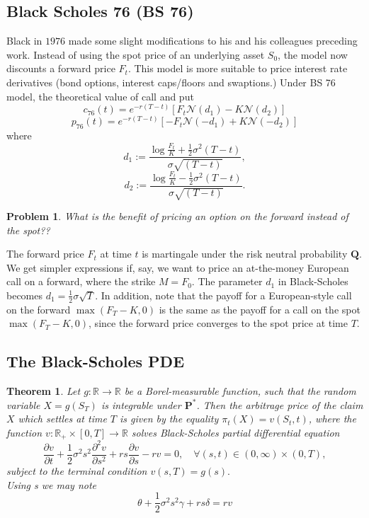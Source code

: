 \documentclass{book}
\newtheorem{theorem}{Theorem}[section]
\newtheorem{problem}{Problem}[section]
\begin{document}
\subsection{Black Scholes 76 (BS 76)}
Black in $1976$ made some slight modifications to his and his colleagues preceding work. Instead of using the spot price of an underlying asset $S_{0}$, the model now discounts a forward price $F_{t}.$ This model is more suitable to price interest rate derivatives (bond options, interest caps/floors and swaptions.) Under BS 76 model, the theoretical value of call and put 
$$
c_{76}(t)=e^{-r(T-t)}[F_{t}\mathcal{N}(d_{1})-K\mathcal{N}(d_{2})]
$$
$$
p_{76}(t)=e^{-r(T-t)}[-F_{t}\mathcal{N}(-d_{1})+K\mathcal{N}(-d_{2})]
$$
where
$$
d_{1}:=\frac{\log\frac{F_{t}}{K}+\frac{1}{2}\sigma^{2}(T-t)}{\sigma\sqrt{(T-t)}},
$$
$$
d_{2}:=\frac{\log\frac{F_{t}}{K}-\frac{1}{2}\sigma^{2}(T-t)}{\sigma\sqrt{(T-t)}}.
$$
\begin{problem}
What is the benefit of pricing an option on the forward instead of the spot??
\end{problem}
The forward price $F_{t}$ at time $t$ is martingale under the risk neutral probability $\mathbf{Q}$.  We get simpler expressions if, say, we want to price an at-the-money European call on a forward, where the strike $M=F_{0}$. The parameter $d_{1}$ in Black-Scholes becomes $d_{1}=\frac{1}{2}\sigma\sqrt{T}$. In addition, note that the payoff for a European-style call on the forward $\max(F_{T}-K,0)$ is the same as the payoff for a call on the spot $\max(F_{T}-K,0)$, since the forward price converges to the spot price at time $T$.
\subsection{The Black-Scholes PDE}
\begin{theorem}
Let $g\colon\mathbb{R}\to\mathbb{R}$ be a Borel-measurable function, such that the random variable $X=g(S_{T})$ is integrable under $\mathbf{P^{\ast}}$. Then the arbitrage price of the claim $X$ which settles at time $T$ is given by the equality $\pi_{t}(X)=v(S_{t},t)$, where the function $v\colon\mathbb{R}_{+}\times [0,T]\to\mathbb{R}$ solves Black-Scholes partial differential equation 
$$
\frac{\partial v}{\partial t}+\frac{1}{2}\sigma^{2}s^{2}\frac{\partial^{2}v}{\partial s^{2}}+rs\frac{\partial v}{\partial s}-rv=0,\quad \forall (s,t)\in(0,\infty)\times(0,T), 
$$
subject to the terminal condition $v(s,T)=g(s).$\\
Using s we may note
$$
\theta+\frac{1}{2}\sigma^{2}s^{2}\gamma+rs\delta=rv
$$
\end{theorem}
\end{document}
